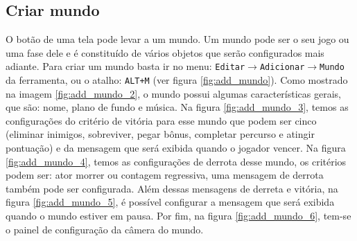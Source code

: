 \documentclass[12pt,twoside,openright,a4paper,english,brazil,sumario=tradicional]{abntex2}
\begin{document}
\begin{anexosenv}
   \subsection{Criar mundo}
   O botão de uma tela pode levar a um mundo. Um mundo pode ser o seu jogo ou uma fase dele e é constituído de vários objetos que serão configurados mais adiante.
   Para criar um mundo basta ir no menu: \texttt{Editar$\rightarrow$Adicionar$\rightarrow$Mundo} da ferramenta, ou o atalho: \texttt{ALT+M} (ver figura \ref{fig:add_mundo}).
   Como mostrado na imagem \ref{fig:add_mundo_2}, o mundo possui algumas características gerais, que são: nome, plano de fundo e música.
   Na figura \ref{fig:add_mundo_3}, temos as configurações do critério de vitória para esse mundo que podem ser cinco (eliminar inimigos, sobreviver, pegar bônus, completar percurso e atingir pontuação) e da mensagem que será exibida quando o jogador vencer.
   Na figura \ref{fig:add_mundo_4}, temos as configurações de derrota desse mundo, os critérios podem ser: ator morrer ou contagem regressiva, uma mensagem de derrota também pode ser configurada.
   Além dessas mensagens de derreta e vitória, na figura \ref{fig:add_mundo_5}, é possível configurar a mensagem que será exibida quando o mundo estiver em pausa.
   Por fim, na figura \ref{fig:add_mundo_6}, tem-se o painel de configuração da câmera do mundo.


\end{anexosenv}
\end{document}
